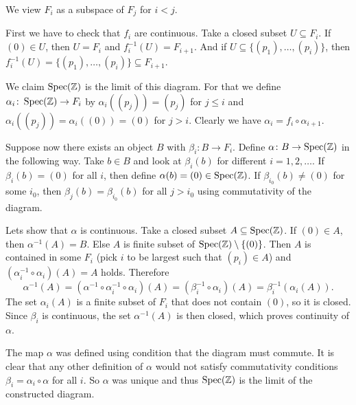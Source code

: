 \begin{exercise}{1}
\begin{enumerate}
{                We view $F_i$ as a subspace of $F_j$ for $i < j$.

                First we have to check that $f_i$ are continuous. Take a closed
                subset $U \subseteq F_i$. If $(0) \in U$, then $U = F_i$ and
                $f^{-1}_i(U) = F_{i+1}$. And if $U \subseteq \{ (p_1), \dots,
                (p_i) \}$, then $f^{-1}_i(U) = \{ (p_1), \dots, (p_i) \}
                \subseteq F_{i+1}$.

                We claim $\operatorname{Spec}(\mathbb{Z})$ is the limit of this diagram. For that we
                define $\alpha_i \colon \operatorname{Spec}(\mathbb{Z}) \rightarrow F_i$ by
                $\alpha_i((p_j)) = (p_j)$ for $j \leq i$ and $\alpha_i((p_j)) =
                \alpha_i((0)) = (0)$ for $j > i$.
                Clearly we have $\alpha_i = f_i \circ \alpha_{i+1}$.

                Suppose now there exists an object $B$ with $\beta_i \colon B
                \rightarrow F_i$. Define $\alpha \colon B \rightarrow \operatorname{Spec}(\mathbb{Z})$
                in the following way. Take $b \in B$ and look at $\beta_i(b)$
                for different $i = 1, 2, \dots$. If $\beta_i(b) = (0)$ for all
                $i$, then define $\alpha(b) = (0) \in \operatorname{Spec}(\mathbb{Z})$. If
                $\beta_{i_0}(b) \not= (0)$ for some $i_0$, then $\beta_j(b) =
                \beta_{i_0}(b)$ for all $j > i_0$ using commutativity of the
                diagram.

                Lets show that $\alpha$ is continuous. Take a closed subset $A
                \subseteq \operatorname{Spec}(\mathbb{Z})$. If $(0) \in A$, then $\alpha^{-1}(A) = B$.
                Else $A$ is finite subset of $\operatorname{Spec}(\mathbb{Z}) \setminus \{(0)\}$. Then
                $A$ is contained in some $F_i$ (pick $i$ to be largest such that
                $(p_i) \in A$) and $(\alpha_i^{-1} \circ \alpha_i)(A) = A$
                holds. Therefore
                \begin{equation*}
                    \alpha^{-1}(A) = (\alpha^{-1} \circ \alpha^{-1}_i \circ
                    \alpha_i)(A) = (\beta^{-1}_i \circ \alpha_i)(A) =
                    \beta^{-1}_i(\alpha_i(A)).
                \end{equation*}
                The set $\alpha_i(A)$ is a finite subset of $F_i$ that does not
                contain $(0)$, so it is closed. Since $\beta_i$ is continuous,
                the set $\alpha^{-1}(A)$ is then closed, which proves continuity
                of $\alpha$.

                The map $\alpha$ was defined using condition that the diagram
                must commute. It is clear that any other definition of $\alpha$
                would not satisfy commutativity conditions $\beta_i = \alpha_i
                \circ \alpha$ for all $i$. So $\alpha$ was unique and thus
                $\operatorname{Spec}(\mathbb{Z})$ is the limit of the constructed diagram.
            }
    \end{enumerate}
\end{exercise}

